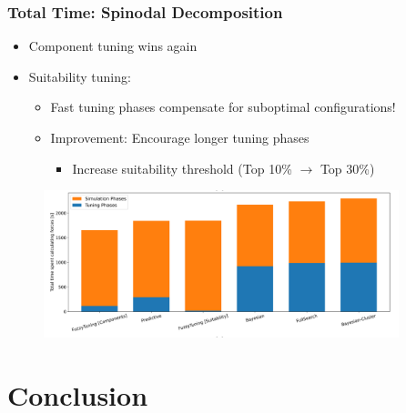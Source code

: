 \documentclass[
	10pt,
	t		%
]{beamer}
\begin{document}
\begin{frame}
	\frametitle{Total Time: Spinodal Decomposition}
	
	\begin{itemize}
		\item Component tuning wins again
		\item Suitability tuning:
		      \begin{itemize}
			      \item Fast tuning phases compensate for suboptimal configurations!
			      \item Improvement: Encourage longer tuning phases
			            \begin{itemize}
				            \item Increase suitability threshold {\scriptsize (Top 10\% $\rightarrow$ Top 30\%)}
			            \end{itemize}
		      \end{itemize}
	\end{itemize}
	
	\begin{figure}
		\centering
		\includegraphics[width=0.92\textwidth]{figures/spinodal-total.png}
	\end{figure}
\end{frame}


\section{Conclusion}
\end{document}
